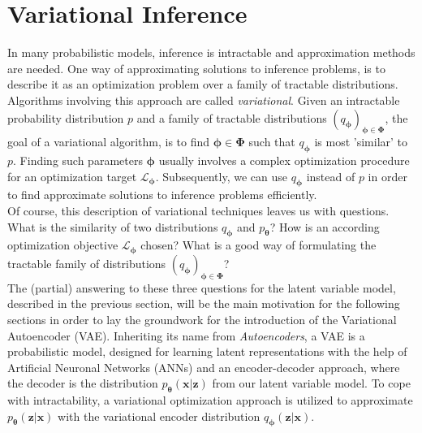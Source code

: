\documentclass[12pt]{report}
\theoremstyle{definition}
\begin{document}
\section{Variational Inference}
In many probabilistic models, inference is intractable and approximation methods are needed. One way of approximating solutions to inference problems, is to describe it as an optimization problem over a family of tractable distributions. Algorithms involving this approach are called \emph{variational}.
Given an intractable probability distribution $p$ and a family of tractable distributions $(q_{\pmb{\phi}})_{\pmb{\phi} \in \pmb{\Phi}}$, the goal of a variational algorithm, is to find $\pmb{\phi} \in \pmb{\Phi}$ such that $q_{\pmb{\phi}}$ is most 'similar' to $p$. Finding such parameters $\pmb{\phi}$ usually involves a complex optimization procedure for an optimization target $\mathcal{L}_{\pmb{\phi}}$. Subsequently, we can use $q_{\pmb{\phi}}$ instead of $p$ in order to find approximate solutions to inference problems efficiently.\\
Of course, this description of variational techniques leaves us with questions. What is the similarity of two distributions $q_{\pmb{\phi}}$ and $p_{\pmb{\theta}}$? How is an according optimization objective $\mathcal{L}_{\pmb{\phi}}$ chosen? What is a good way of formulating the tractable family of distributions $(q_{\pmb{\phi}})_{\pmb{\phi} \in \pmb{\Phi}}$? \\
The (partial) answering to these three questions for the latent variable model, described in the previous section, will be the main motivation for the following sections in order to lay the groundwork for the introduction of the Variational Autoencoder (VAE). Inheriting its name from \emph{Autoencoders}, a VAE is a probabilistic model, designed for learning latent representations with the help of Artificial Neuronal Networks (ANNs) and an encoder-decoder approach, where the decoder is the distribution $p_{\pmb{\theta}}(\mathbf{x}|\mathbf{z})$ from our latent variable model. To cope with intractability, a variational optimization approach is utilized to approximate $p_{\pmb{\theta}}(\mathbf{z}|\mathbf{x})$ with the variational encoder distribution $q_{\pmb{\phi}}(\mathbf{z}|\mathbf{x})$.
\end{document}
